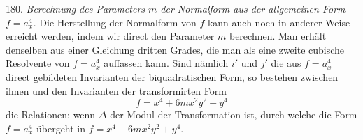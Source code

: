 180. \textit{Berechnung des Parameters $m$ der Normalform aus der allgemeinen Form $f=a_x^4$.} Die Herstellung der Normalform von $f$ kann auch noch in anderer Weise erreicht werden, indem wir direct den Parameter $m$ berechnen. Man erhält denselben aus einer Gleichung dritten Grades, die man als eine zweite cubische Resolvente von $f=a_x^4$ auffassen kann. Sind nämlich $i'$ und $j'$ die aus $f=a_x^4$ direct gebildeten Invarianten der biquadratischen Form, so bestehen zwischen ihnen und den Invarianten
der transformirten Form
\[
f=x^4+6mx^2y^2+y^4
\]
die Relationen:
wenn $\Delta$ der Modul der Transformation ist, durch welche die Form $f=a_x^4$ übergeht in $f=x^4+6mx^2y^2+y^4$.


